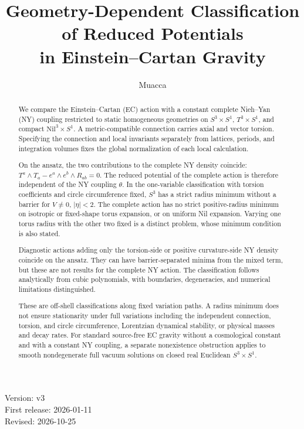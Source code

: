 \documentclass[11pt,a4paper]{article}
\title{Geometry-Dependent Classification of Reduced Potentials\\
in Einstein--Cartan Gravity}
\author{Muacca}
\date{}
\begin{document}
\maketitle
\begin{center}
Version: v3\\
First release: 2026-01-11\\
Revised: 2026-10-25
\end{center}
\begin{abstract}
We compare the Einstein--Cartan (EC) action with a constant complete
Nieh--Yan (NY) coupling restricted to static homogeneous geometries on
$S^3\times S^1$, $T^3\times S^1$, and compact
$\mathrm{Nil}^3\times S^1$.
A metric-compatible connection carries axial and vector torsion.
Specifying the connection and local invariants separately from lattices,
periods, and integration volumes fixes the global normalization of each
local calculation.

On the ansatz, the two contributions to the complete NY density coincide:
$T^a\wedge T_a-e^a\wedge e^b\wedge R_{ab}=0$.
The reduced potential of the complete action is therefore independent
of the NY coupling $\theta$.
In the one-variable classification with torsion coefficients and circle
circumference fixed, $S^3$ has a strict radius minimum without a barrier
for $V\ne0$, $|\eta|<2$.
The complete action has no strict positive-radius minimum on isotropic
or fixed-shape torus expansion, or on uniform Nil expansion.
Varying one torus radius with the other two fixed is a distinct problem,
whose minimum condition is also stated.

Diagnostic actions adding only the torsion-side or positive curvature-side
NY density coincide on the ansatz. They can have barrier-separated minima
from the mixed term, but these are not results for the complete NY action.
The classification follows analytically from cubic polynomials, with
boundaries, degeneracies, and numerical limitations distinguished.

These are off-shell classifications along fixed variation paths.
A radius minimum does not ensure stationarity under full variations
including the independent connection, torsion, and circle circumference,
Lorentzian dynamical stability, or physical masses and decay rates.
For standard source-free EC gravity without a cosmological constant
and with a constant NY coupling, a separate nonexistence obstruction
applies to smooth nondegenerate full vacuum solutions on closed real
Euclidean $S^3\times S^1$.
\end{abstract}
\clearpage
\tableofcontents
\clearpage








\clearpage
\appendix







\clearpage
\end{document}
